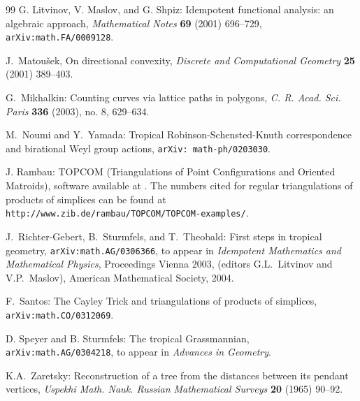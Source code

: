 \documentclass[11pt]{amsart}
\begin{document}
\begin{thebibliography}{99}
 G. Litvinov, V. Maslov,
and G. Shpiz:  Idempotent functional analysis: an
algebraic approach,
\emph{Mathematical Notes} {\bf 69} (2001) 696--729,
{\tt arXiv:math.FA/0009128}.

 J.~Matou\v sek,
On directional convexity,
\emph{Discrete and Computational Geometry} {\bf 25} (2001) 389--403.

 G.~Mikhalkin: Counting curves via lattice paths in polygons,
\emph{C. R. Acad. Sci. Paris} {\bf 336} (2003), no. 8, 629--634.

  M.~Noumi and Y.~Yamada:
Tropical Robinson-Schensted-Knuth correspondence and
birational Weyl group actions, {\tt arXiv: math-ph/0203030}.

 J. Rambau: 
TOPCOM (Triangulations of Point Configurations and Oriented Matroids), 
software available at \hfill {}. The numbers cited for regular triangulations of products of simplices 
can be found at {\tt http://www.zib.de/rambau/TOPCOM/TOPCOM-examples/}.

 J.~Richter-Gebert, B.~Sturmfels, and T.~Theobald:
 First steps in tropical geometry,  {\tt arXiv:math.AG/0306366}, 
to appear in
\emph{Idempotent Mathematics and  Mathematical  Physics},
Proceedings Vienna 2003, (editors G.L.~Litvinov  and  V.P.~Maslov),
American Mathematical Society, 2004.

 F.~Santos: The Cayley Trick and triangulations of 
products of simplices, {\tt arXiv:math.CO/0312069}.

D. Speyer and B. Sturmfels: The tropical Grassmannian,
{\tt arXiv:math.AG/0304218}, to appear in
\emph{Advances in Geometry}.

 K.A.~Zaretsky: Reconstruction of a tree from 
the distances between its pendant vertices, \emph{Uspekhi Math.
Nauk. Russian Mathematical Surveys} {\bf 20} (1965) 90--92.

\end{thebibliography}
\end{document}
